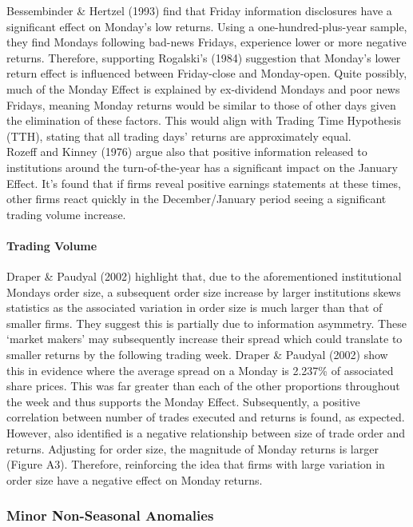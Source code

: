 \documentclass[11pt, english]{article}
\begin{document}
			Bessembinder \& Hertzel (1993) find that Friday information disclosures have a significant effect on Monday’s low returns. Using a one-hundred-plus-year sample, they find Mondays following bad-news Fridays, experience lower or more negative returns. Therefore, supporting Rogalski’s (1984) suggestion that Monday’s lower return effect is influenced between Friday-close and Monday-open. Quite possibly, much of the Monday Effect is explained by ex-dividend Mondays and poor news Fridays, meaning Monday returns would be similar to those of other days given the elimination of these factors. This would align with Trading Time Hypothesis (TTH), stating that all trading days’ returns are approximately equal.\\

			Rozeff and Kinney (1976) argue also that positive information released to institutions around the turn-of-the-year has a significant impact on the January Effect. It’s found that if firms reveal positive earnings statements at these times, other firms react quickly in the December/January period seeing a significant trading volume increase.

			\paragraph{Trading Volume}

			Draper \& Paudyal (2002) highlight that, due to the aforementioned institutional Mondays order size, a subsequent order size increase by larger institutions skews statistics as the associated variation in order size is much larger than that of smaller firms. They suggest this is partially due to information asymmetry. These `market makers' may subsequently increase their spread which could translate to smaller returns by the following trading week. Draper \& Paudyal (2002) show this in evidence where the average spread on a Monday is 2.237\% of associated share prices. This was far greater than each of the other proportions throughout the week and thus supports the Monday Effect. Subsequently, a positive correlation between number of trades executed and returns is found, as expected. However, also identified is a negative relationship between size of trade order and returns. Adjusting for order size, the magnitude of Monday returns is larger (Figure A3). Therefore, reinforcing the idea that firms with large variation in order size have a negative effect on Monday returns.

		\subsubsection{Minor Non-Seasonal Anomalies}
\end{document}
